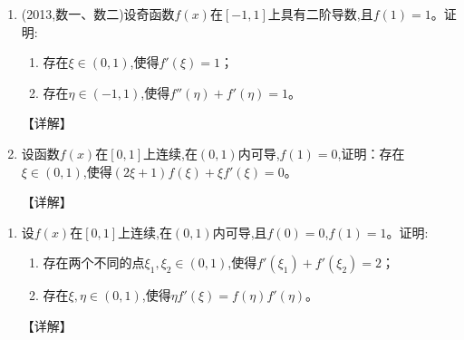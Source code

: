 \documentclass[12pt, a4paper, oneside, UTF8]{ctexbook}
\begin{document}
\begin{remark}
\end{remark}

\begin{enumerate}[label=\arabic*.,start=25]
    \item  (2013,数一、数二)设奇函数$f(x)$在$[-1,1]$上具有二阶导数,且$f(1)=1$。证明:
    \begin{enumerate}[label=(\roman*)]
        \item 存在$\xi\in(0,1)$,使得$f'(\xi)=1$；
        \item 存在$\eta\in(-1,1)$,使得$f''(\eta)+f'(\eta)=1$。
    \end{enumerate}
    
    \begin{solution}
    【详解】
    \end{solution}
    
    \item  设函数$f(x)$在$[0,1]$上连续,在$(0,1)$内可导,$f(1)=0$,证明：存在$\xi\in(0,1)$,使得$(2\xi+1)f(\xi)+\xi f'(\xi)=0$。
    
    \begin{solution}
    【详解】
    \end{solution}
\end{enumerate}

\begin{remark}
\end{remark}

\begin{enumerate}[label=\arabic*.,start=27]
    \item  设$f(x)$在$[0,1]$上连续,在$(0,1)$内可导,且$f(0)=0$,$f(1)=1$。证明:
    \begin{enumerate}[label=(\roman*)]
        \item 存在两个不同的点$\xi_1,\xi_2\in(0,1)$,使得$f'(\xi_1)+f'(\xi_2)=2$；
        \item 存在$\xi,\eta\in(0,1)$,使得$\eta f'(\xi)=f(\eta)f'(\eta)$。
    \end{enumerate}
    
    \begin{solution}
    【详解】
    \end{solution}
\end{enumerate}

\begin{remark}
\end{remark}
\end{document}
